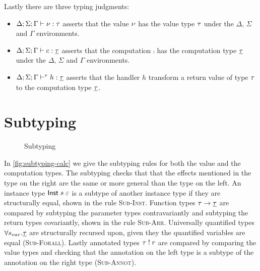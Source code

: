 {Lastly there are three typing judgments:
\begin{itemize}
\setlength\itemsep{0.5em}
\item $\Delta;\Sigma;\Gamma \vdash \nu : \tau$ asserts that the value $\nu$ has the value type $\tau$ under the $\Delta$, $\Sigma$ and $\Gamma$ environments.
\item $\Delta;\Sigma;\Gamma \vdash c : \underline{\tau}$ asserts that the computation $\comp$ has the computation type $\underline{\tau}$ under the $\Delta$, $\Sigma$ and $\Gamma$ environments.
\item $\Delta;\Sigma;\Gamma \vdash^{\tau} h : \underline{\tau}$ asserts that the handler $h$ transform a return value of type $\tau$ to the computation type $\underline{\tau}$.
\end{itemize}

\section{Subtyping}
\label{sec:subtyping}
\begin{figure}[h]
\caption{Subtyping}
\centering
{}
\end{figure}

In \cref{fig:subtyping-calc} we give the subtyping rules for both the value and the computation types.
The subtyping checks that that the effects mentioned in the type on the right are the same or more general than the type on the left.
An instance type $\mathsf{Inst} \; s \; \varepsilon$ is a subtype of another instance type if they are structurally equal, shown in the rule \textsc{Sub-Inst}.
Function types $\tau \rightarrow \underline{\tau}$ are compared by subtyping the parameter types contravariantly and subtyping the return types covariantly, shown in the rule \textsc{Sub-Arr}.
Universally quantified types $\forall s_{var} . \underline{\tau}$ are structurally recursed upon, given they the quantified variables are equal (\textsc{Sub-Forall}).
Lastly annotated types $\tau \; ! \; r$ are compared by comparing the value types and checking that the annotation on the left type is a subtype of the annotation on the right type (\textsc{Sub-Annot}).

}
